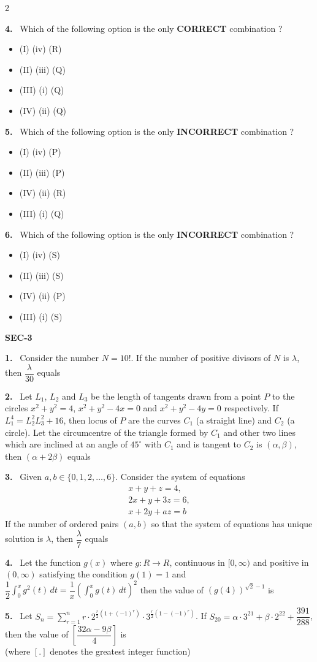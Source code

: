 \documentclass[10pt]{extarticle}
\newcommand{\papersec}[1]{\par\bigskip{\centering\Large\bfseries PAPER-#1\par}\medskip}
\newcommand{\sect}[1]{\par\smallskip\noindent\textbf{#1}\par}
\newcommand{\qn}[1]{\par\smallskip\noindent\textbf{#1.}~}
\newcommand{\paraq}[2]{\par\smallskip\noindent\textbf{Paragraph for Questions #1 and #2}\par}
\newenvironment{qoptions}{\begin{itemize}[leftmargin=1.8em,itemsep=1pt,topsep=2pt,label={}]}{\end{itemize}}
\newcommand{\opt}[2]{\item[(#1)] #2}
\begin{document}
\begin{multicols}{2}
\qn{4} Which of the following option is the only \textbf{CORRECT} combination ?
\begin{qoptions}
\opt{A}{(I) (iv) (R)}
\opt{B}{(II) (iii) (Q)}
\opt{C}{(III) (i) (Q)}
\opt{D}{(IV) (ii) (Q)}
\end{qoptions}
\qn{5} Which of the following option is the only \textbf{INCORRECT} combination ?
\begin{qoptions}
\opt{A}{(I) (iv) (P)}
\opt{B}{(II) (iii) (P)}
\opt{C}{(IV) (ii) (R)}
\opt{D}{(III) (i) (Q)}
\end{qoptions}
\qn{6} Which of the following option is the only \textbf{INCORRECT} combination ?
\begin{qoptions}
\opt{A}{(I) (iv) (S)}
\opt{B}{(II) (iii) (S)}
\opt{C}{(IV) (ii) (P)}
\opt{D}{(III) (i) (S)}
\end{qoptions}
\sect{SEC-3}
\qn{1} Consider the number $N=10!$. If the number of positive divisors of $N$ is $\lambda$, then $\dfrac{\lambda}{30}$ equals
\qn{2} Let $L_1$, $L_2$ and $L_3$ be the length of tangents drawn from a point $P$ to the circles $x^2+y^2=4$, $x^2+y^2-4x=0$ and $x^2+y^2-4y=0$ respectively. If $L_1^4=L_2^2L_3^2+16$, then locus of $P$ are the curves $C_1$ (a straight line) and $C_2$ (a circle). Let the circumcentre of the triangle formed by $C_1$ and other two lines which are inclined at an angle of $45^\circ$ with $C_1$ and is tangent to $C_2$ is $(\alpha,\beta)$, then $(\alpha+2\beta)$ equals
\qn{3} Given $a,b\in\{0,1,2,\dots,6\}$. Consider the system of equations
\begin{gather*}
x+y+z=4,\\
2x+y+3z=6,\\
x+2y+az=b
\end{gather*}
If the number of ordered pairs $(a,b)$ so that the system of equations has unique solution is $\lambda$, then $\dfrac\lambda7$ equals
\qn{4} Let the function $g(x)$ where $g:R\to R$, continuous in $[0,\infty)$ and positive in $(0,\infty)$ satisfying the condition $g(1)=1$ and $\dfrac12\displaystyle\int_0^x g^2(t)\,dt=\dfrac1x\left(\displaystyle\int_0^x g(t)\,dt\right)^2$ then the value of $\left(g(4)\right)^{\sqrt2-1}$ is
\qn{5} Let $S_n=\displaystyle\sum_{r=1}^{n}r\cdot2^{\frac r2(1+(-1)^r)}\cdot3^{\frac r2(1-(-1)^r)}$. If $S_{20}=\alpha\cdot3^{21}+\beta\cdot2^{22}+\dfrac{391}{288}$, then the value of $\left[\dfrac{32\alpha-9\beta}{4}\right]$ is\\
(where $[.]$ denotes the greatest integer function)
\papersec{2}
\gdef\paraq#1#2{\par\smallskip\noindent\textbf{Paragraph for Questions #1 and #2}\par}

\end{multicols}
\end{document}
